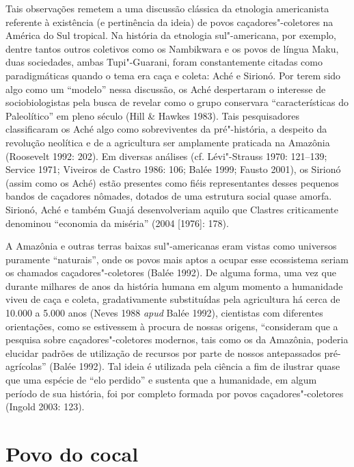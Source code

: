 Tais observações remetem a uma discussão clássica da etnologia
americanista referente à existência (e pertinência da ideia) de povos
caçadores"-coletores na América do Sul tropical. Na história da etnologia
sul"-americana, por exemplo, dentre tantos outros coletivos como os
Nambikwara e os povos de língua Maku, duas sociedades, ambas
Tupi"-Guarani, foram constantemente citadas como paradigmáticas quando o
tema era caça e coleta: Aché e Sirionó. Por terem sido algo como um
``modelo'' nessa discussão, os Aché despertaram o interesse de
sociobiologistas pela busca de revelar como o grupo conservara
``características do Paleolítico'' em pleno século  (Hill \& Hawkes
1983). Tais pesquisadores classificaram os Aché algo como sobreviventes
da pré"-história, a despeito da revolução neolítica e de a agricultura
ser amplamente praticada na Amazônia (Roosevelt 1992: 202). Em diversas
análises (cf. Lévi"-Strauss 1970: 121--139; Service 1971; Viveiros de
Castro 1986: 106; Balée 1999; Fausto 2001), os Sirionó (assim como os
Aché) estão presentes como fiéis representantes desses pequenos bandos
de caçadores nômades, dotados de uma estrutura social quase amorfa.
Sirionó, Aché e também Guajá desenvolveriam aquilo que Clastres
criticamente denominou ``economia da miséria'' (2004 {[}1976{]}: 178).

A Amazônia e outras terras baixas sul"-americanas eram vistas como
universos puramente ``naturais'', onde os povos mais aptos a ocupar esse
ecossistema seriam os chamados caçadores"-coletores (Balée 1992). De
alguma forma, uma vez que durante milhares de anos da história humana em
algum momento a humanidade viveu de caça e coleta, gradativamente
substituídas pela agricultura há cerca de 10.000 a 5.000 anos (Neves
1988 \emph{apud} Balée 1992), cientistas com diferentes orientações, como se
estivessem à procura de nossas origens, ``consideram que a pesquisa
sobre caçadores"-coletores modernos, tais como os da Amazônia, poderia
elucidar padrões de utilização de recursos por parte de nossos
antepassados pré-agrícolas'' (Balée 1992). Tal ideia é utilizada pela
ciência a fim de ilustrar quase que uma espécie de ``elo perdido'' e
sustenta que a humanidade, em algum período de sua história, foi por
completo formada por povos caçadores"-coletores (Ingold 2003: 123).

\section{Povo do cocal}

